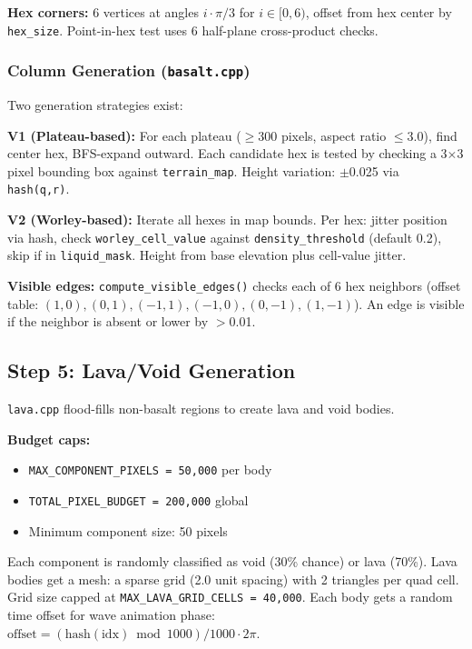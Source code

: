 \documentclass[11pt,a4paper]{article}
\begin{document}
\textbf{Hex corners:} 6 vertices at angles $i \cdot \pi/3$ for $i \in [0,6)$, offset from hex center by \texttt{hex\_size}. Point-in-hex test uses 6 half-plane cross-product checks.

\subsubsection{Column Generation (\texttt{basalt.cpp})}

Two generation strategies exist:

\textbf{V1 (Plateau-based):} For each plateau ($\geq$300 pixels, aspect ratio $\leq$3.0), find center hex, BFS-expand outward. Each candidate hex is tested by checking a 3$\times$3 pixel bounding box against \texttt{terrain\_map}. Height variation: $\pm$0.025 via \texttt{hash(q,r)}.

\textbf{V2 (Worley-based):} Iterate all hexes in map bounds. Per hex: jitter position via hash, check \texttt{worley\_cell\_value} against \texttt{density\_threshold} (default 0.2), skip if in \texttt{liquid\_mask}. Height from base elevation plus cell-value jitter.

\textbf{Visible edges:} \texttt{compute\_visible\_edges()} checks each of 6 hex neighbors (offset table: $(1,0), (0,1), (-1,1), (-1,0), (0,-1), (1,-1)$). An edge is visible if the neighbor is absent or lower by $>$0.01.

\subsection{Step 5: Lava/Void Generation}
\label{sec:lava}

\texttt{lava.cpp} flood-fills non-basalt regions to create lava and void bodies.

\textbf{Budget caps:}
\begin{itemize}
  \item \texttt{MAX\_COMPONENT\_PIXELS = 50{,}000} per body
  \item \texttt{TOTAL\_PIXEL\_BUDGET = 200{,}000} global
  \item Minimum component size: 50 pixels
\end{itemize}

Each component is randomly classified as void (30\% chance) or lava (70\%). Lava bodies get a mesh: a sparse grid (2.0 unit spacing) with 2 triangles per quad cell. Grid size capped at \texttt{MAX\_LAVA\_GRID\_CELLS = 40{,}000}. Each body gets a random time offset for wave animation phase: $\text{offset} = (\text{hash}(\text{idx}) \bmod 1000) / 1000 \cdot 2\pi$.
\end{document}
